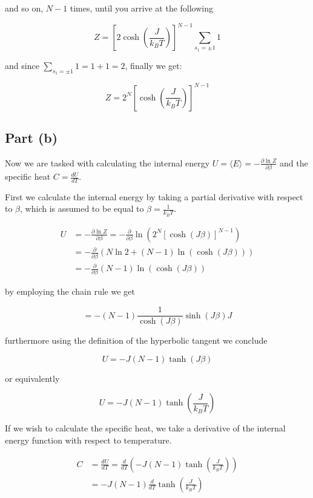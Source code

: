 ﻿\documentclass[11pt]{article}
\begin{document}
and so on, \(N-1\) times, until you arrive at the following

\[
Z=\left[2\cosh\left(\frac{J}{k_B T}\right)\right]^{N-1}\sum_{s_1=\pm1}1 \tag{13}
\]

and since \(\sum_{s_1=\pm1}1=1+1=2\), finally we get:

\[
\boxed{Z=2^N\left[\cosh\left(\frac{J}{k_B T}\right)\right]^{N-1}} \tag{14}
\]

    \subsection*{Part (b)}

Now we are tasked with calculating the internal energy
\(U=\langle E\rangle=-\frac{\partial \ln Z}{\partial \beta}\) and the
specific heat \(C=\frac{dU}{dT}\).

First we calculate the internal energy by taking a partial derivative
with respect to \(\beta\), which is assumed to be equal to
\(\beta=\frac{1}{k_B T}\).

\[
\begin{aligned}
U &= -\frac{\partial \ln Z}{\partial \beta} = -\frac{\partial}{\partial \beta} \ln\left(2^N\left[\cosh(J\beta)\right]^{N-1}\right) \\
&= -\frac{\partial}{\partial \beta} \left(N\ln 2 + (N-1)\ln\left(\cosh(J\beta)\right)\right) \\
&= -\frac{\partial}{\partial \beta} (N-1) \ln\left(\cosh(J\beta)\right)
\end{aligned}
\]

by employing the chain rule we get

\[
= -(N-1)\frac{1}{\cosh(J\beta)}\sinh(J\beta)J
\]

furthermore using the definition of the hyperbolic tangent we conclude

\[
\boxed{U = -J(N-1)\tanh(J\beta)} \tag{15}
\]

or equivalently

\[
\boxed{U = -J(N-1)\tanh\left(\frac{J}{k_B T}\right)} \tag{16}
\]

If we wish to calculate the specific heat, we take a derivative of the
internal energy function with respect to temperature.

\[
\begin{aligned}
C &= \frac{dU}{dT} = \frac{d}{dT}\left(-J(N-1)\tanh\left(\frac{J}{k_B T}\right)\right) \\
&= -J(N-1)\frac{d}{dT}\tanh\left(\frac{J}{k_B T}\right)
\end{aligned}
\]
\end{document}
